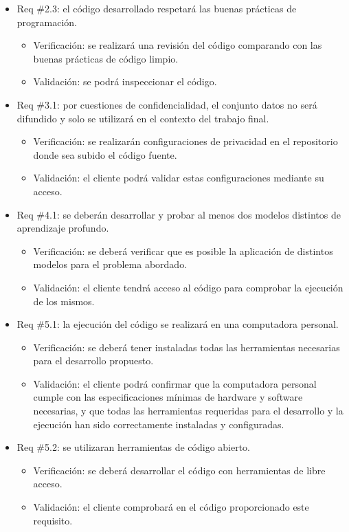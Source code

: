 \documentclass[
11pt, %
]{charter}
\begin{document}
\begin{itemize}
\item Req \#2.3: el código desarrollado respetará las buenas prácticas de programación.
\begin{itemize}
	\item Verificación: se realizará una revisión del código comparando con las buenas prácticas de código
	 limpio.
	\item Validación: se podrá inspeccionar el código.
\end{itemize}

\item Req \#3.1: por cuestiones de confidencialidad, el conjunto datos no será difundido y solo se
utilizará en el contexto del trabajo final.
\begin{itemize}
	\item Verificación: se realizarán configuraciones de privacidad en el repositorio donde sea subido el código fuente.
	\item Validación: el cliente podrá validar estas configuraciones mediante su acceso.
\end{itemize}

\item Req \#4.1: se deberán desarrollar y probar al menos dos modelos distintos de aprendizaje profundo.
\begin{itemize}
	\item Verificación: se deberá verificar que es posible la aplicación de distintos modelos para el problema abordado.
	\item Validación: el cliente tendrá acceso al código para comprobar la ejecución de los mismos.
\end{itemize}

\item Req \#5.1: la ejecución del código se realizará en una computadora personal.
\begin{itemize}
	\item Verificación: se deberá tener instaladas todas las herramientas necesarias para el desarrollo propuesto.
	\item Validación: el cliente podrá confirmar que la computadora personal cumple con las especificaciones 
    mínimas de hardware y software necesarias, y que todas las herramientas requeridas para el desarrollo y 
    la ejecución han sido correctamente instaladas y configuradas.
\end{itemize}

\item Req \#5.2: se utilizaran herramientas de código abierto.
\begin{itemize}
	\item Verificación: se deberá desarrollar el código con herramientas de libre acceso.
	\item Validación: el cliente comprobará en el código proporcionado este requisito.
\end{itemize}


\end{itemize}
\end{document}
